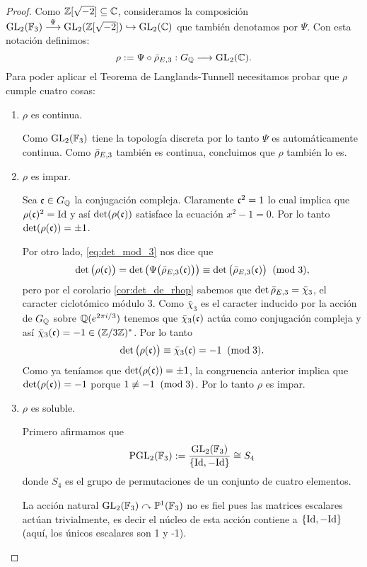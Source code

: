 \begin{proof}
Como $\mathbb{Z}[\sqrt{-2}]\subseteq\mathbb{C}$, consideramos la composici\'on $\mathrm{GL}_2(\mathbb{F}_3)\overset{\Psi}{\longrightarrow}\mathrm{GL}_2(\mathbb{Z}[\sqrt{-2}])\hookrightarrow\mathrm{GL}_2(\mathbb{C})$ que tambi\'en denotamos por $\Psi$. Con esta notaci\'on definimos:
  \[
    \rho:=\Psi\circ\bar{\rho}_{E,3}:G_{\mathbb{Q}}\longrightarrow\mathrm{GL}_2(\mathbb{C}).
  \]
  Para poder aplicar el Teorema de Langlands-Tunnell necesitamos probar que $\rho$ cumple cuatro cosas:
  \begin{enumerate}[label=\emph{\roman*})]
  \item $\rho$ es continua.

    \-\;\; Como $\mathrm{GL}_2(\mathbb{F}_3)$ tiene la topolog\'ia discreta por lo tanto $\Psi$ es autom\'aticamente continua. Como $\bar{\rho}_{E,3}$ tambi\'en es continua, concluimos que $\rho$ tambi\'en lo es.
  \item\label{inciso_sigma_impar} $\rho$ es impar.

    \-\;\; Sea $\mathfrak{c}\in G_{\mathbb{Q}}$ la conjugaci\'on compleja. Claramente $\mathfrak{c}^2=1$ lo cual implica que $\rho(\mathfrak{c})^2=\mathrm{Id}$ y as\'i $\det(\rho(\mathfrak{c}))$ satisface la ecuaci\'on $x^2-1=0$. Por lo tanto $\det(\rho(\mathfrak{c}))=\pm1$.

    \-\;\; Por otro lado, \eqref{eq:det_mod_3} nos dice que
    \[
      \det\big(\rho(\mathfrak{c})\big) = \det\big(\Psi\big(\bar{\rho}_{E,3}(\mathfrak{c})\big)\big) \equiv
      \det\big(\bar{\rho}_{E,3}(\mathfrak{c})\big) \;\;(\mathrm{mod}\; 3),
    \]
    pero por el corolario \ref{cor:det_de_rhop} sabemos que $\det\bar{\rho}_{E,3}=\bar{\chi}_3$, el caracter ciclot\'omico m\'odulo 3. Como $\bar{\chi}_3$ es el caracter inducido por la acci\'on de $G_{\mathbb{Q}}$ sobre $\mathbb{Q}(e^{2\pi i/3})$ tenemos que $\bar{\chi}_3(\mathfrak{c})$ act\'ua como conjugaci\'on compleja y as\'i $\bar{\chi}_3(\mathfrak{c})=-1\in(\mathbb{Z}/3\mathbb{Z})^*$. Por lo tanto
    \[
      \det\big(\rho(\mathfrak{c})\big) \equiv \bar{\chi}_3(\mathfrak{c})= -1 \;\;(\mathrm{mod}\; 3).
    \]
    Como ya ten\'iamos que $\det(\rho(\mathfrak{c}))=\pm 1$, la congruencia anterior implica que $\det(\rho(\mathfrak{c}))=-1$ porque $1\not\equiv -1\;\;(\mathrm{mod}\; 3)$. Por lo tanto $\rho$ es impar.
  \item $\rho$ es soluble.
    
    \-\;\; Primero afirmamos que
    \begin{equation}\label{eq:pgl23_S4}
      \mathrm{PGL}_2(\mathbb{F}_3):=\frac{\mathrm{GL}_2(\mathbb{F}_3)}{\{\mathrm{Id},-\mathrm{Id}\}}\cong S_4
    \end{equation}
    donde $S_4$ es el grupo de permutaciones de un conjunto de cuatro elementos.

    \-\;\; La acción natural $\mathrm{GL}_2(\mathbb{F}_3)\curvearrowright\mathbb{P}^1(\mathbb{F}_3)$ no es fiel pues las matrices escalares actúan trivialmente, es decir el núcleo de esta acción contiene a $\{\mathrm{Id},-\mathrm{Id}\}$ (aquí, los únicos escalares son 1 y -1).
    

\end{enumerate}
\end{proof}
